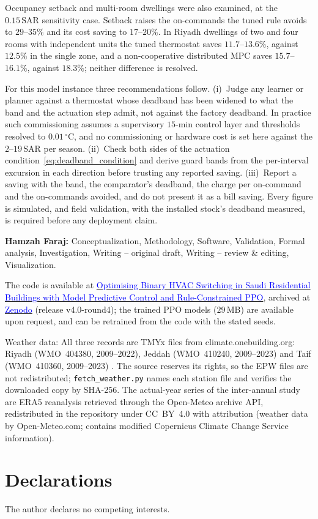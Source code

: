 \documentclass[pdflatex,sn-mathphys-num,iicol]{sn-jnl}
\theoremstyle{thmstyleone}\newtheorem{proposition}{Proposition}\newtheorem{corollary}{Corollary}
\theoremstyle{thmstyletwo}\newtheorem{remark}{Remark}\newtheorem{observation}{Observation}
\theoremstyle{thmstylethree}\newtheorem{definition}{Definition}
\newcommand{\SAR}{\text{SAR}}
\begin{document}
Occupancy setback and multi-room dwellings were also examined, at the $0.15\,\SAR$ sensitivity case. Setback raises the on-commands the tuned rule avoids to $29$--$35\%$ and its cost saving to $17$--$20\%$. In Riyadh dwellings of two and four rooms with independent units the tuned thermostat saves $11.7$--$13.6\%$, against $12.5\%$ in the single zone, and a non-cooperative distributed MPC saves $15.7$--$16.1\%$, against $18.3\%$; neither difference is resolved.

For this model instance three recommendations follow. (i)~Judge any learner or planner against a thermostat whose deadband has been widened to what the band and the actuation step admit, not against the factory deadband. In practice such commissioning assumes a supervisory $15$-min control layer and thresholds resolved to $0.01\,^\circ$C, and no commissioning or hardware cost is set here against the $2$--$19\,\SAR$ per season. (ii)~Check both sides of the actuation condition~\eqref{eq:deadband_condition} and derive guard bands from the per-interval excursion in each direction before trusting any reported saving. (iii)~Report a saving with the band, the comparator's deadband, the charge per on-command and the on-commands avoided, and do not present it as a bill saving. Every figure is simulated, and field validation, with the installed stock's deadband measured, is required before any deployment claim.

\backmatter

\textbf{Hamzah Faraj:} Conceptualization, Methodology, Software, Validation, Formal analysis, Investigation, Writing -- original draft, Writing -- review \& editing, Visualization.

The code is available at \href{https://github.com/drhamzahfaraj/Hybrid-Rule-Constrained-PPO-for-Cost-Effective-Binary-HVAC-Scheduling-in-Saudi-Residential-Buildings}{\textcolor{blue}{Optimising Binary HVAC Switching in Saudi Residential Buildings with Model Predictive Control and Rule-Constrained PPO}}, archived at \href{https://doi.org/10.5281/zenodo.24199676}{\textcolor{blue}{Zenodo}} (release v4.0-round4); the trained PPO models ($29\,$MB) are available upon request, and can be retrained from the code with the stated seeds.

Weather data: All three records are TMYx files from climate.onebuilding.org: Riyadh (WMO~404380, 2009--2022), Jeddah (WMO~410240, 2009--2023) and Taif (WMO~410360, 2009--2023) \citep{EPW2023}. The source reserves its rights, so the EPW files are not redistributed; \texttt{fetch\_weather.py} names each station file and verifies the downloaded copy by SHA-256. The actual-year series of the inter-annual study are ERA5 reanalysis \citep{Hersbach2020} retrieved through the Open-Meteo archive API, redistributed in the repository under CC~BY~4.0 with attribution (weather data by Open-Meteo.com; contains modified Copernicus Climate Change Service information).

\section*{Declarations}

The author declares no competing interests.


\end{document}

